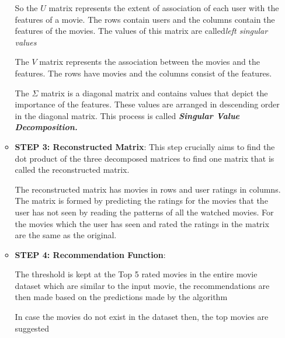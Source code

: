 \documentclass[a4paper,10pt]{article}
\begin{document}
\begin{enumerate}
\begin{itemize}
So the  \( U \) matrix represents the extent of association of each user with the features of a movie. The rows contain users and the columns contain the features of the movies. The values of this matrix are called\textit{left singular values}

The \( V \) matrix represents the association between the movies and the features. The rows have movies and the columns consist of the features. 

The \( \Sigma \) matrix is a diagonal matrix and contains values that depict the importance of the features. These values are arranged in descending order in the diagonal matrix. 
This process is called \textit{\textbf{Singular Value Decomposition.}}

\item \textbf{STEP 3: Reconstructed Matrix}:
\vspace{2pt}
    This step crucially aims to find the dot product of the three decomposed matrices to find one matrix that is called the reconstructed matrix.

    The reconstructed matrix has movies in rows and user ratings in columns. The matrix is formed by predicting the ratings for the movies that the user has not seen by reading the patterns of all the watched movies. For the movies which the user has seen and rated the ratings in the matrix are the same as the original.

\item \textbf{STEP 4: Recommendation Function}:

    The threshold is kept at the Top 5 rated movies in the entire movie dataset which are similar to the input movie, the recommendations are then made based on the predictions made by the algorithm
    
    In case the movies do not exist in the dataset then, the top movies are suggested


\end{itemize}
\end{enumerate}
\end{document}
